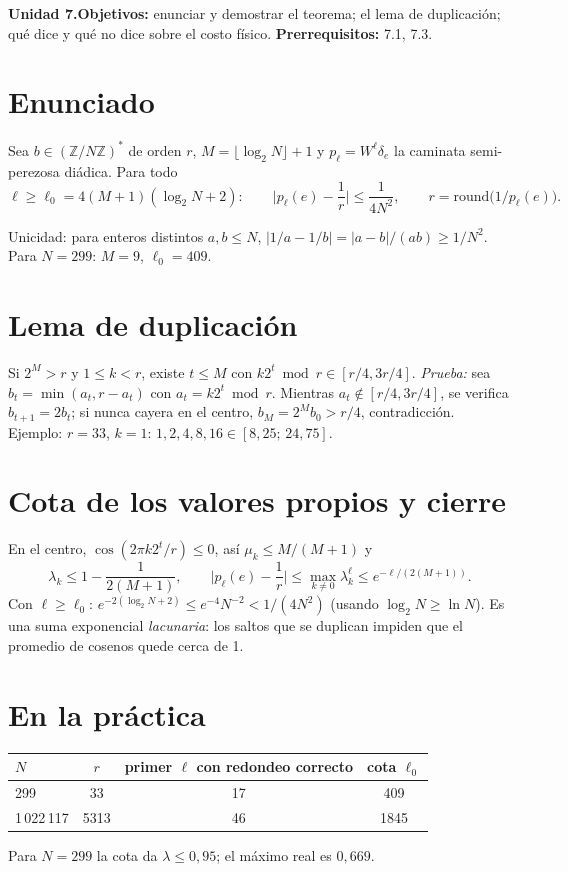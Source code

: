 \documentclass[11pt,a4paper]{article}
\begin{document}

\noindent\textbf{Unidad 7.}\quad\textbf{Objetivos:} enunciar y demostrar el teorema; el lema de duplicación; qué dice y qué no dice sobre el costo físico.
\textbf{Prerrequisitos:} 7.1, 7.3.

\section{Enunciado}
\begin{definicion}
Sea $b\in(\mathbb Z/N\mathbb Z)^*$ de orden $r$, $M=\lfloor\log_2N\rfloor+1$ y $p_\ell=W^\ell\delta_e$ la caminata semi-perezosa diádica. Para todo
\[\ell\ge\ell_0=4(M+1)(\log_2N+2):\qquad\Big|p_\ell(e)-\frac1r\Big|\le\frac1{4N^2},\qquad r=\mathrm{round}\big(1/p_\ell(e)\big).\]
\end{definicion}
Unicidad: para enteros distintos $a,b\le N$, $|1/a-1/b|=|a-b|/(ab)\ge1/N^2$. Para $N=299$: $M=9$, $\ell_0=409$.

\section{Lema de duplicación}
Si $2^M>r$ y $1\le k<r$, existe $t\le M$ con $k2^t\bmod r\in[r/4,3r/4]$. \emph{Prueba:} sea $b_t=\min(a_t,r-a_t)$ con $a_t=k2^t\bmod r$. Mientras
$a_t\notin[r/4,3r/4]$, se verifica $b_{t+1}=2b_t$; si nunca cayera en el centro, $b_M=2^Mb_0>r/4$, contradicción. Ejemplo: $r=33$, $k=1$: $1,2,4,8,16\in[8{,}25;\,24{,}75]$.

\section{Cota de los valores propios y cierre}
En el centro, $\cos(2\pi k2^t/r)\le0$, así $\mu_k\le M/(M+1)$ y
\[\lambda_k\le1-\frac1{2(M+1)},\qquad\Big|p_\ell(e)-\frac1r\Big|\le\max_{k\ne0}\lambda_k^\ell\le e^{-\ell/(2(M+1))}.\]
Con $\ell\ge\ell_0$: $e^{-2(\log_2N+2)}\le e^{-4}N^{-2}<1/(4N^2)$ (usando $\log_2N\ge\ln N$). Es una suma exponencial \emph{lacunaria}: los saltos que se
duplican impiden que el promedio de cosenos quede cerca de 1.

\section{En la práctica \evS}
\begin{center}\begin{tabular}{lccc}\toprule
$N$ & $r$ & primer $\ell$ con redondeo correcto & cota $\ell_0$\\\midrule
299 & 33 & 17 & 409\\
1\,022\,117 & 5313 & 46 & 1845\\\bottomrule\end{tabular}\end{center}
Para $N=299$ la cota da $\lambda\le0{,}95$; el máximo real es $0{,}669$.
\end{document}
